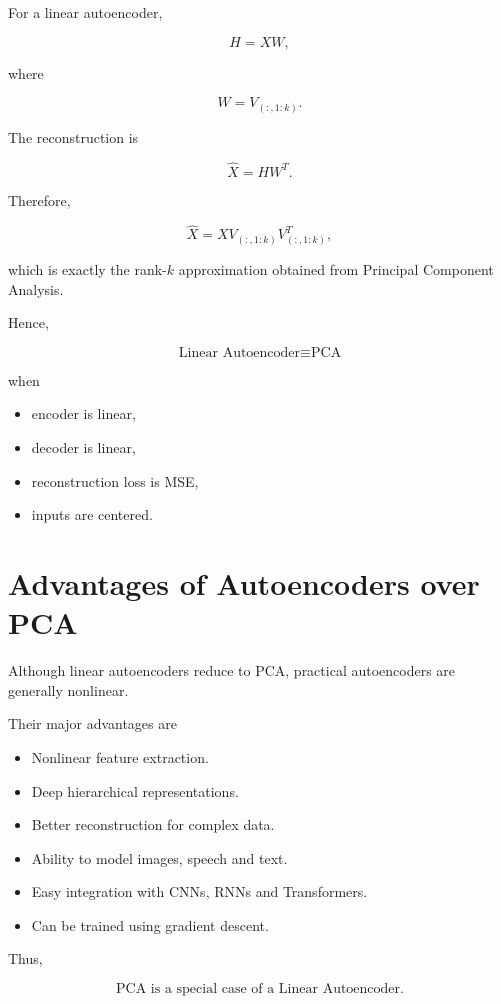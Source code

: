 \documentclass{article}
\begin{document}
For a linear autoencoder,

\[
H=XW,
\]

where

\[
W=V_{(:,1:k)}.
\]

The reconstruction is

\[
\hat{X}=HW^{T}.
\]

Therefore,

\[
\hat{X}
=
XV_{(:,1:k)}
V_{(:,1:k)}^{T},
\]

which is exactly the rank-\(k\) approximation obtained from Principal
Component Analysis.

Hence,

\[
\boxed{
	\text{Linear Autoencoder}
	\equiv
	\text{PCA}
}
\]

when

\begin{itemize}
	\item encoder is linear,
	\item decoder is linear,
	\item reconstruction loss is MSE,
	\item inputs are centered.
\end{itemize}

\section{Advantages of Autoencoders over PCA}

Although linear autoencoders reduce to PCA, practical autoencoders are
generally nonlinear.

Their major advantages are

\begin{itemize}
	\item Nonlinear feature extraction.
	\item Deep hierarchical representations.
	\item Better reconstruction for complex data.
	\item Ability to model images, speech and text.
	\item Easy integration with CNNs, RNNs and Transformers.
	\item Can be trained using gradient descent.
\end{itemize}

Thus,

\[
\boxed{
	\text{PCA is a special case of a Linear Autoencoder.}
}
\]
\end{document}
